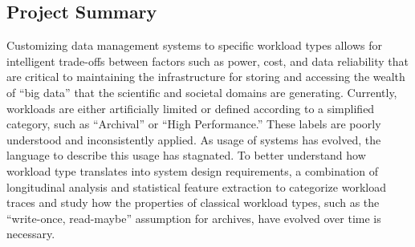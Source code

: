 
\subsection*{Project Summary}



Customizing data management systems to specific workload types allows for intelligent trade-offs between factors such as power, cost, and data reliability
that are critical to maintaining the infrastructure for storing and
accessing the wealth of ``big data'' that the scientific and societal domains are
generating.  Currently, workloads are either artificially limited or defined
according to a simplified category, such as ``Archival'' or ``High Performance.''%
These labels are poorly
understood and inconsistently applied.  As usage of systems has evolved, the
language to describe this usage has stagnated.  To better understand how
workload type translates into system design requirements, a combination
of longitudinal analysis and statistical feature extraction to categorize
workload traces and study how the properties of classical workload types, such
as the ``write-once, read-maybe'' assumption for archives, have evolved over
time is necessary.  

